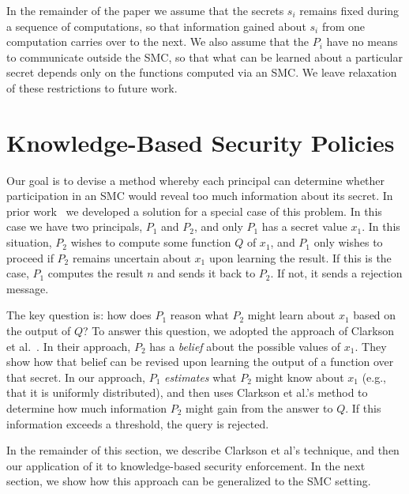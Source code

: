 \documentclass[10pt]{sigplanconf}
\begin{document}
In the remainder of the paper we assume that the secrets $s_i$ remains fixed during a sequence of computations, so that information
gained about $s_i$ from one computation carries over to the next.  We also assume that the $P_i$
have no means to communicate outside the SMC, so that what can be learned
about a particular secret depends only on the functions computed via
an SMC.  We leave relaxation of these restrictions to future work.

\section{Knowledge-Based Security Policies}
\label{sec:KBSE-asymmetric}

Our goal is to devise a method whereby each principal can determine
whether participation in an SMC would reveal too much information
about its secret.  In prior work~\cite{mardziel11belief} we developed
a solution for a special case of this problem. In this case we have
two principals, $P_1$ and $P_2$, and only $P_1$ has a secret value
$x_1$.  In this situation, $P_2$
wishes to compute some function $Q$ of $x_1$, and $P_1$ only wishes to
proceed if $P_2$ remains uncertain about $x_1$ upon learning the
result.  If this is the case, $P_1$ computes the result $n$ and sends
it back to $P_2$.  If not, it sends a rejection message.

The key question is: how does $P_1$ reason what $P_2$ might learn
about $x_1$ based on the output of $Q$?  To answer this question, we
adopted the approach of Clarkson et
al.~\cite{clarkson09quantifying}. In their approach, $P_2$ has a
\emph{belief} about the possible values of $x_1$. They show how that
belief can be revised upon learning the output of a function over that
secret.  In our approach, $P_1$ \emph{estimates} what $P_2$ might know
about $x_1$ (e.g., that it is uniformly distributed), and then uses
Clarkson et al.'s method to determine how much information $P_2$ might
gain from the answer to $Q$.  If this information exceeds a threshold,
the query is rejected.

In the remainder of this section, we describe Clarkson
et al's technique, and then our application of it to knowledge-based
security enforcement.  In the next section, we show how this
approach can be generalized to the SMC setting.
\end{document}
